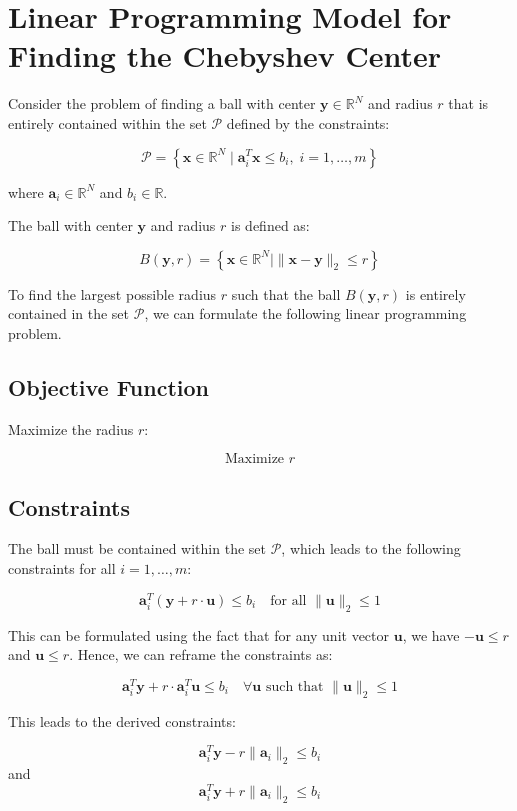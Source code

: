 \documentclass{article}
\begin{document}
\section*{Linear Programming Model for Finding the Chebyshev Center}

Consider the problem of finding a ball with center $\mathbf{y} \in \mathbb{R}^N$ and radius $r$ that is entirely contained within the set $\mathcal{P}$ defined by the constraints:

\[
\mathcal{P} = \left\{ \mathbf{x} \in \mathbb{R}^N \mid \mathbf{a}_i^T \mathbf{x} \leq b_i, \; i = 1, \ldots, m \right\}
\]

where $\mathbf{a}_i \in \mathbb{R}^N$ and $b_i \in \mathbb{R}$.

The ball with center $\mathbf{y}$ and radius $r$ is defined as:

\[
B(\mathbf{y}, r) = \left\{ \mathbf{x} \in \mathbb{R}^N \mid \|\mathbf{x} - \mathbf{y}\|_2 \leq r \right\}
\]

To find the largest possible radius $r$ such that the ball $B(\mathbf{y}, r)$ is entirely contained in the set $\mathcal{P}$, we can formulate the following linear programming problem.

\subsection*{Objective Function}
Maximize the radius $r$:

\[
\text{Maximize } r
\]

\subsection*{Constraints}
The ball must be contained within the set $\mathcal{P}$, which leads to the following constraints for all $i = 1,\ldots,m$:

\[
\mathbf{a}_i^T (\mathbf{y} + r \cdot \mathbf{u}) \leq b_i \quad \text{for all } \|\mathbf{u}\|_2 \leq 1
\]

This can be formulated using the fact that for any unit vector $\mathbf{u}$, we have $-\mathbf{u} \leq r$ and $\mathbf{u} \leq r$. Hence, we can reframe the constraints as:

\[
\mathbf{a}_i^T \mathbf{y} + r \cdot \mathbf{a}_i^T \mathbf{u} \leq b_i \quad \forall \mathbf{u} \text{ such that } \|\mathbf{u}\|_2 \leq 1
\]

This leads to the derived constraints:

\[
\mathbf{a}_i^T \mathbf{y} - r \|\mathbf{a}_i\|_2 \leq b_i
\]
and
\[
\mathbf{a}_i^T \mathbf{y} + r \|\mathbf{a}_i\|_2 \leq b_i
\]
\end{document}
